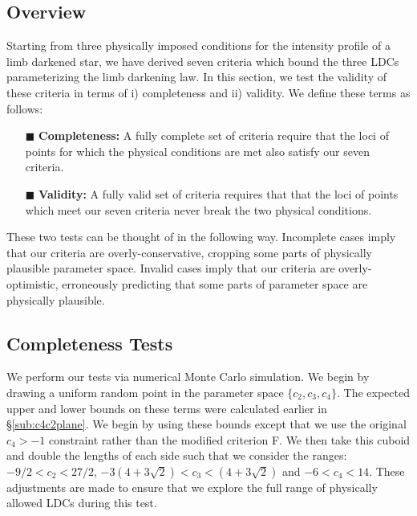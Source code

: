
\subsection{Overview}

Starting from three physically imposed conditions for the intensity profile of a
limb darkened star, we have derived seven criteria which bound the three LDCs
parameterizing the \citet{sing:2009} limb darkening law. In this section, we
test the validity of these criteria in terms of i) completeness and ii) 
validity. We define these terms as follows:

\begin{itemize}
\item[{\tiny$\blacksquare$}] \textbf{Completeness:} A fully complete set of 
criteria require that the loci of points for which the physical conditions are
met also satisfy our seven criteria.
\item[{\tiny$\blacksquare$}] \textbf{Validity:} A fully valid set of criteria 
requires that that the loci of points which meet our seven criteria 
never break the two physical conditions.
\end{itemize}

These two tests can be thought of in the following way. Incomplete cases imply 
that our criteria are overly-conservative, cropping some parts of physically 
plausible parameter space. Invalid cases imply that our criteria are
overly-optimistic, erroneously predicting that some parts of parameter space are
physically plausible.

\subsection{Completeness Tests}

We perform our tests via numerical Monte Carlo simulation. We begin by
drawing a uniform random point in the parameter space $\{c_2,c_3,c_4\}$. The 
expected upper and lower bounds on these terms were calculated earlier in 
\S\ref{sub:c4c2plane}. We begin by using these bounds except that we use the 
original $c_4>-1$ constraint rather than the modified criterion F. We then
take this cuboid and double the lengths of each side such that we consider
the ranges: $-9/2<c_2<27/2$, $-3(4+3\sqrt{2})<c_3<(4+3\sqrt{2})$ and
$-6<c_4<14$. These adjustments are made to ensure that we explore the full
range of physically allowed LDCs during this test.

